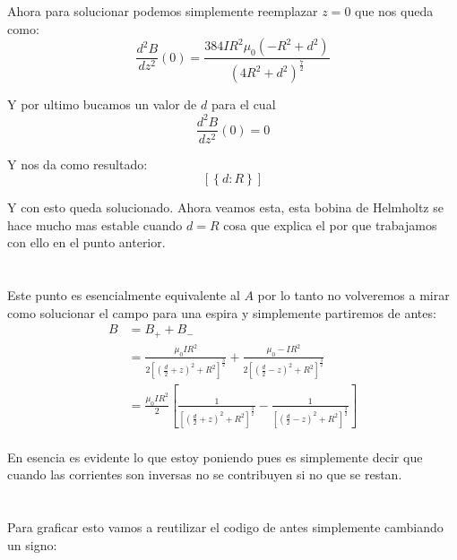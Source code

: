 \documentclass{report}
\begin{document}
Ahora para solucionar podemos simplemente reemplazar $z = 0$ que nos queda como:
\[
	\frac{d^2B}{dz^2}(0) = \frac{384 I R^{2} \mu_{0} \left(- R^{2} + d^{2}\right)}{\left(4 R^{2} + d^{2}\right)^{\frac{7}{2}}}
\]

Y por ultimo bucamos un valor de $d$ para el cual
\[
	\frac{d^2B}{dz^2}(0) = 0
\]

Y nos da como resultado:
\[
	\left[ \left\{ d : R\right\}\right]
\]

Y con esto queda solucionado. Ahora veamos esta, esta bobina de Helmholtz se hace mucho mas estable cuando $d = R$ cosa que explica el por que trabajamos con ello en el punto anterior.

\section{}

Este punto es esencialmente equivalente al $A$ por lo tanto no volveremos a mirar como solucionar el campo para una espira y simplemente partiremos de antes:
\begin{align*}
	B &= B_+ + B_-\\
	& = \frac{\mu_0 I R^2}{2\left[ \left(\frac{d}{2} + z\right)^2 + R^2\right]^{\frac{3}{2}}} + \frac{\mu_0 - I R^2}{2\left[ \left(\frac{d}{2} - z\right)^2 + R^2\right]^{\frac{3}{2}}}\\
	& = \frac{\mu_0 I R^2}{2} \left[\frac{1}{\left[ \left(\frac{d}{2} + z\right)^2 + R^2\right]^{\frac{3}{2}}} - \frac{1}{\left[ \left(\frac{d}{2} - z\right)^2 + R^2\right]^{\frac{3}{2}}}\right]\\
\end{align*}

En esencia es evidente lo que estoy poniendo pues es simplemente decir que cuando las corrientes son inversas no se contribuyen si no que se restan.

\section{}

Para graficar esto vamos a reutilizar el codigo de antes simplemente cambiando un signo:


\end{document}
